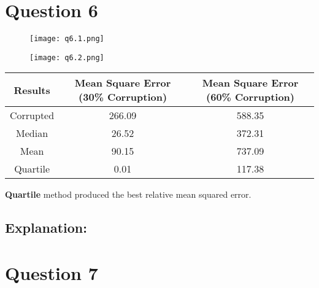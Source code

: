 \documentclass[11pt]{article}
\begin{document}
\section{Question 6}
\begin{figure}[H]
    \centering
    \texttt{[image: q6.1.png]}
\end{figure}
\begin{figure}[H]
    \centering
    \texttt{[image: q6.2.png]}
\end{figure}
\begin{center}
    \begin{tabular}{|c|c|c|}
        \hline
        \textbf{Results} & \textbf{Mean Square Error (30\% Corruption)} & \textbf{Mean Square Error (60\% Corruption)} \\
        \hline
        Corrupted        & 266.09                                       & 588.35                                       \\
        \hline
        Median           & 26.52                                        & 372.31                                       \\
        \hline
        Mean             & 90.15                                        & 737.09                                       \\
        \hline
        Quartile         & 0.01                                         & 117.38                                       \\
        \hline
    \end{tabular}
\end{center}
\noindent
\textbf{Quartile} method produced the best relative mean squared error.
\subsection*{Explanation:}





\newpage
\section{Question 7}
\end{document}
